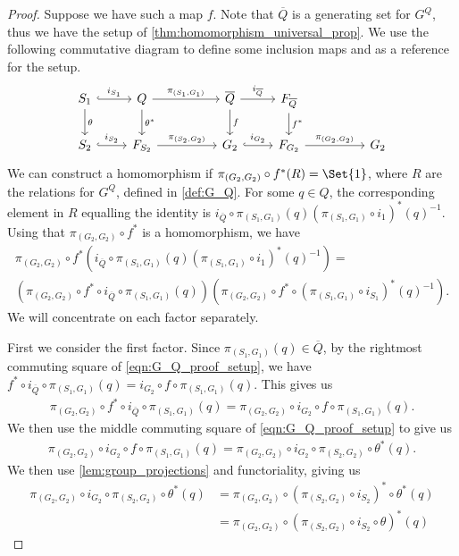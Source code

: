 \begin{proof}
	Suppose we have such a map $f$.
	Note that  $\overline{Q}$ is a generating set for  $G^Q$, thus we have the setup of \cref{thm:homomorphism_universal_prop}.
	We use the following commutative diagram to define some inclusion maps and as a reference for the setup.
	\begin{equation}
		\begin{tikzcd}
			S_1 \ar[d, "\theta"] \ar[r, hook, "i_{S_1}"] & Q \ar[d, "\theta^*"] \ar[rr, "\pi_{(S_1, G_1)}"] & & \overline{Q} \ar[d, "f"] \ar[r, "i_{\overline{Q}}"] & F_{\overline{Q}} \ar[d, "f^*"]
			\\ S_2 \ar[r, hook, "i_{S_2}"] & F_{S_2} \ar[rr, "\pi_{(S_2, G_2)}"] & & G_2 \ar[r, hook, "i_{G_2}"] & F_{G_2} \ar[rr, "\pi_{(G_2, G_2)}"] & & G_2
		\end{tikzcd}
		\label{eqn:G_Q_proof_setup}
	\end{equation}
	We can construct a homomorphism if $\pi_{(G_2, G_2)} \circ f^*(R) = \Set{1}$, where $R$ are the relations for $G^Q$, defined in \cref{def:G_Q}.
	For some $q \in Q$, the corresponding element in $R$ equalling the identity is  $i_{\overline{Q}} \circ \pi_{(S_1,G_1)}(q)(\pi_{(S_1,G_1)} \circ i_1)^*(q)^{-1}$.
	Using that $\pi_{(G_2,G_2)} \circ f^*$ is a homomorphism, we have
	\begin{align*}
		\pi_{(G_2,G_2)} \circ f^* \left(i_{\overline{Q}} \circ \pi_{(S_1,G_1)}(q)(\pi_{(S_1,G_1)} \circ i_1)^*(q)^{-1}\right) =
		\\ \left(\pi_{(G_2,G_2)} \circ f^* \circ i_{\overline{Q}} \circ \pi_{(S_1,G_1)} (q)\right) \left( \pi_{(G_2,G_2)} \circ f^* \circ\left( \pi_{(S_1,G_1)} \circ i_{S_1}\right)^*(q)^{-1} \right).
	\end{align*}
	We will concentrate on each factor separately.

	First we consider the first factor.
	Since $\pi_{(S_1, G_1)}(q) \in \overline{Q}$, by the rightmost commuting square of \eqref{eqn:G_Q_proof_setup}, we have $f^* \circ i_{\overline{Q}} \circ \pi_{(S_1, G_1)}(q) = i_{G_2} \circ f \circ \pi_{(S_1,G_1)} (q)$.
	This gives us
	\begin{align*}
		\pi_{(G_2,G_2)} \circ f^* \circ i_{\overline{Q}} \circ \pi_{(S_1,G_1)} (q) = \pi_{(G_2,G_2)} \circ i_{G_2} \circ f \circ \pi_{(S_1,G_1)}(q).
	\end{align*}
	We then use the middle commuting square of \eqref{eqn:G_Q_proof_setup} to give us
	\begin{align*}
		\pi_{(G_2,G_2)} \circ i_{G_2} \circ f \circ \pi_{(S_1,G_1)}(q) = \pi_{(G_2,G_2)} \circ i_{G_2} \circ \pi_{(S_2,G_2)} \circ \theta^*(q).
	\end{align*}
	We then use \cref{lem:group_projections} and functoriality, giving us
	\begin{align*}
		\pi_{(G_2,G_2)} \circ i_{G_2} \circ \pi_{(S_2,G_2)} \circ \theta^*(q) &= \pi_{(G_2,G_2)} \circ \left( \pi_{(S_2,G_2)} \circ i_{S_2} \right)^*  \circ \theta^*(q)
										   \\ &= \pi_{(G_2,G_2)} \circ \left( \pi_{(S_2,G_2)} \circ i_{S_2} \circ \theta \right)^*(q)
	\end{align*}


\end{proof}
